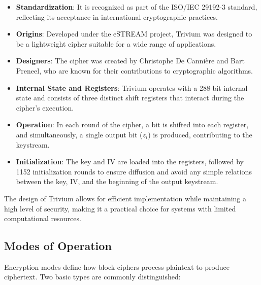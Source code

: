 \documentclass[12pt]{article}
\begin{document}
\begin{itemize}
    \item \textbf{Standardization}: It is recognized as part of the ISO/IEC 29192-3 standard, reflecting its acceptance in international cryptographic practices.
    \item \textbf{Origins}: Developed under the eSTREAM project, Trivium was designed to be a lightweight cipher suitable for a wide range of applications.
    \item \textbf{Designers}: The cipher was created by Christophe De Cannière and Bart Preneel, who are known for their contributions to cryptographic algorithms.
    \item \textbf{Internal State and Registers}: Trivium operates with a 288-bit internal state and consists of three distinct shift registers that interact during the cipher's execution.
    \item \textbf{Operation}: In each round of the cipher, a bit is shifted into each register, and simultaneously, a single output bit (\( z_i \)) is produced, contributing to the keystream.
    \item \textbf{Initialization}: The key and IV are loaded into the registers, followed by 1152 initialization rounds to ensure diffusion and avoid any simple relations between the key, IV, and the beginning of the output keystream.
\end{itemize}

The design of Trivium allows for efficient implementation while maintaining a high level of security, making it a practical choice for systems with limited computational resources.


\subsection*{Modes of Operation}

Encryption modes define how block ciphers process plaintext to produce ciphertext. Two basic types are commonly distinguished:
\end{document}
